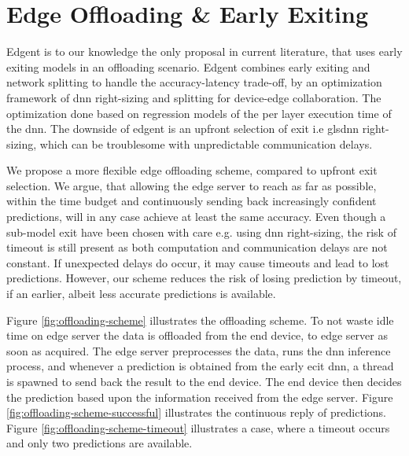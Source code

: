 \chapter{Edge Offloading \& Early Exiting}

Edgent \cite{li_edge_2018} is to our knowledge the only proposal in current literature, that uses early exiting models in an offloading scenario. Edgent combines early exiting and network splitting to handle the accuracy-latency trade-off, by an optimization framework of \gls{dnn} right-sizing and splitting for device-edge collaboration. The optimization done based on regression models of the per layer execution time of the \gls{dnn}. The downside of edgent is an upfront selection of exit i.e gls{dnn} right-sizing, which can be troublesome with unpredictable communication delays. 

We propose a more flexible edge offloading scheme, compared to upfront exit selection. We argue, that allowing the edge server to reach as far as possible, within the time budget and continuously sending back increasingly confident predictions, will in any case achieve at least the same accuracy. Even though a sub-model exit have been chosen with care e.g. using \gls{dnn} right-sizing, the risk of timeout is still present as both computation and communication delays are not constant. If unexpected delays do occur, it may cause timeouts and lead to lost predictions. However, our scheme reduces the risk of losing prediction by timeout, if an earlier, albeit less accurate predictions is available. 

Figure \ref{fig:offloading-scheme} illustrates the offloading scheme. To not waste idle time on edge server the data is offloaded from the end device, to edge server as soon as acquired. The edge server preprocesses the data, runs the \gls{dnn} inference process, and whenever a prediction is obtained from the early ecit \gls{dnn}, a thread is spawned to send back the result to the end device. The end device then decides the prediction based upon the information received from the edge server. Figure \ref{fig:offloading-scheme-successful} illustrates the continuous reply of predictions. Figure \ref{fig:offloading-scheme-timeout} illustrates a case, where a timeout occurs and only two predictions are available.

